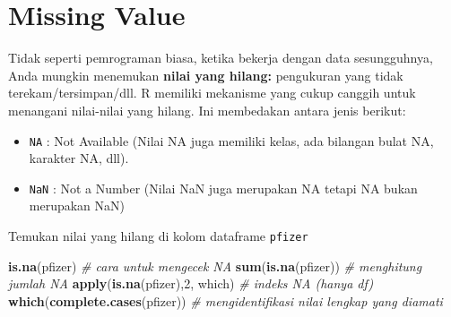 \documentclass[
]{book}
\newenvironment{Shaded}{\begin{snugshade}}{\end{snugshade}}
\newcommand{\CommentTok}[1]{\textcolor[rgb]{0.56,0.35,0.01}{\textit{#1}}}
\newcommand{\DecValTok}[1]{\textcolor[rgb]{0.00,0.00,0.81}{#1}}
\newcommand{\FunctionTok}[1]{\textcolor[rgb]{0.13,0.29,0.53}{\textbf{#1}}}
\newcommand{\NormalTok}[1]{#1}
\newcommand{\OtherTok}[1]{\textcolor[rgb]{0.56,0.35,0.01}{#1}}
\newcommand{\SpecialCharTok}[1]{\textcolor[rgb]{0.81,0.36,0.00}{\textbf{#1}}}
\providecommand{\tightlist}{%
  \setlength{\itemsep}{0pt}\setlength{\parskip}{0pt}}
\begin{document}
\begin{Shaded}
\end{Shaded}

\hypertarget{missing-value}{%
\section{Missing Value}\label{missing-value}}

Tidak seperti pemrograman biasa, ketika bekerja dengan data sesungguhnya, Anda mungkin menemukan \textbf{nilai yang hilang:} pengukuran yang tidak terekam/tersimpan/dll. R memiliki mekanisme yang cukup canggih untuk menangani nilai-nilai yang hilang. Ini membedakan antara jenis berikut:

\begin{itemize}
\tightlist
\item
  \texttt{NA} : Not Available (Nilai NA juga memiliki kelas, ada bilangan bulat NA, karakter NA, dll).
\item
  \texttt{NaN} : Not a Number (Nilai NaN juga merupakan NA tetapi NA bukan merupakan NaN)
\end{itemize}

Temukan nilai yang hilang di kolom dataframe \texttt{pfizer}

\begin{Shaded}
\begin{Highlighting}[]
\FunctionTok{is.na}\NormalTok{(pfizer)                                     }\CommentTok{\# cara untuk mengecek NA}
\FunctionTok{sum}\NormalTok{(}\FunctionTok{is.na}\NormalTok{(pfizer))                                }\CommentTok{\# menghitung jumlah NA}
\FunctionTok{apply}\NormalTok{(}\FunctionTok{is.na}\NormalTok{(pfizer),}\DecValTok{2}\NormalTok{, which)                     }\CommentTok{\# indeks NA (hanya df)}
\FunctionTok{which}\NormalTok{(}\FunctionTok{complete.cases}\NormalTok{(pfizer))                     }\CommentTok{\# mengidentifikasi nilai lengkap yang diamati}
\end{Highlighting}
\end{Shaded}
\end{document}
